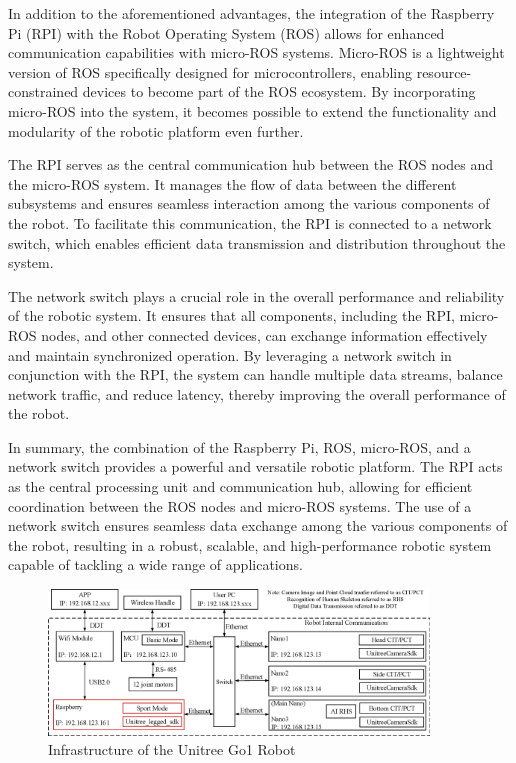 \documentclass[12pt]{article}
\begin{document}
In addition to the aforementioned advantages, the integration of the Raspberry Pi (RPI) with the Robot Operating System (ROS) allows for enhanced communication capabilities with micro-ROS systems. Micro-ROS is a lightweight version of ROS specifically designed for microcontrollers, enabling resource-constrained devices to become part of the ROS ecosystem. By incorporating micro-ROS into the system, it becomes possible to extend the functionality and modularity of the robotic platform even further.

The RPI serves as the central communication hub between the ROS nodes and the micro-ROS system. It manages the flow of data between the different subsystems and ensures seamless interaction among the various components of the robot. To facilitate this communication, the RPI is connected to a network switch, which enables efficient data transmission and distribution throughout the system.

The network switch plays a crucial role in the overall performance and reliability of the robotic system. It ensures that all components, including the RPI, micro-ROS nodes, and other connected devices, can exchange information effectively and maintain synchronized operation. By leveraging a network switch in conjunction with the RPI, the system can handle multiple data streams, balance network traffic, and reduce latency, thereby improving the overall performance of the robot.

In summary, the combination of the Raspberry Pi, ROS, micro-ROS, and a network switch provides a powerful and versatile robotic platform. The RPI acts as the central processing unit and communication hub, allowing for efficient coordination between the ROS nodes and micro-ROS systems. The use of a network switch ensures seamless data exchange among the various components of the robot, resulting in a robust, scalable, and high-performance robotic system capable of tackling a wide range of applications.

\begin{figure}[H]
    \centering
    \includegraphics[width=0.9\textwidth]{Go1CommFram_E.png}
    \caption{Infrastructure of the Unitree Go1 Robot}
\end{figure}
\end{document}
